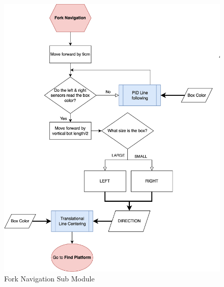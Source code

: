 \documentclass[12pt]{report}
\begin{document}
\begin{figure}[H]
    \centering
    \includegraphics[width=1\textwidth]{Images/flowchart/fork_navigation.pdf}
    \caption{Fork Navigation Sub Module}
    \label{fig:fc:fork-navigation}
\end{figure}
\end{document}
